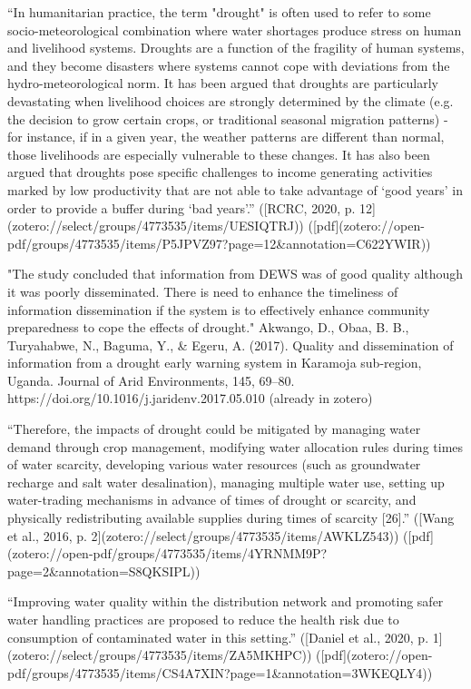 {%
“In humanitarian practice, the term "drought" is often used to refer to some socio-meteorological combination where water shortages produce stress on human and livelihood systems. Droughts are a function of the fragility of human systems, and they become disasters where systems cannot cope with deviations from the hydro-meteorological norm. It has been argued that droughts are particularly devastating when livelihood choices are strongly determined by the climate (e.g. the decision to grow certain crops, or traditional seasonal migration patterns) - for instance, if in a given year, the weather patterns are different than normal, those livelihoods are especially vulnerable to these changes. It has also been argued that droughts pose specific challenges to income generating activities marked by low productivity that are not able to take advantage of ‘good years’ in order to provide a buffer during ‘bad years’.” ([RCRC, 2020, p. 12](zotero://select/groups/4773535/items/UESIQTRJ)) ([pdf](zotero://open-pdf/groups/4773535/items/P5JPVZ97?page=12&annotation=C622YWIR))

"The study concluded that information from DEWS was of good quality although it was poorly disseminated. There is need to enhance the timeliness of information dissemination if the system is to effectively enhance community preparedness to cope the effects of drought." Akwango, D., Obaa, B. B., Turyahabwe, N., Baguma, Y., & Egeru, A. (2017). Quality and dissemination of information from a drought early warning system in Karamoja sub-region, Uganda. Journal of Arid Environments, 145, 69–80. https://doi.org/10.1016/j.jaridenv.2017.05.010 (already in zotero)


“Therefore, the impacts of drought could be mitigated by managing water demand through crop management, modifying water allocation rules during times of water scarcity, developing various water resources (such as groundwater recharge and salt water desalination), managing multiple water use, setting up water-trading mechanisms in advance of times of drought or scarcity, and physically redistributing available supplies during times of scarcity [26].” ([Wang et al., 2016, p. 2](zotero://select/groups/4773535/items/AWKLZ543)) ([pdf](zotero://open-pdf/groups/4773535/items/4YRNMM9P?page=2&annotation=S8QKSIPL))

“Improving water quality within the distribution network and promoting safer water handling practices are proposed to reduce the health risk due to consumption of contaminated water in this setting.” ([Daniel et al., 2020, p. 1](zotero://select/groups/4773535/items/ZA5MKHPC)) ([pdf](zotero://open-pdf/groups/4773535/items/CS4A7XIN?page=1&annotation=3WKEQLY4))

}
